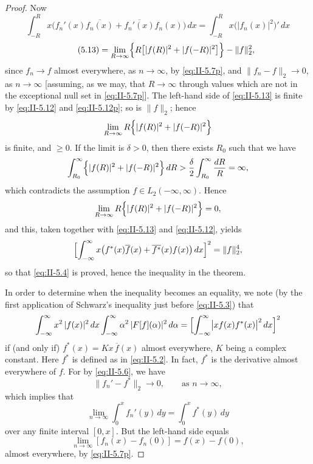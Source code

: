 \begin{proof}
Now
\[
\int_{-R}^{R}x\bigl(f_{n}'(x)\overline{f_{n}(x)}+\overline{f_{n}'(x)}f_{n}(x)\bigr)\,dx
=\int_{-R}^{R}x\bigl(|f_{n}(x)|^{2}\bigr)'\,dx
\]
\begin{equation}\tag{5.13}\label{eq:II-5.13}
=\lim_{R\to\infty}\Bigl\{R\bigl[|f(R)|^{2}+|f(-R)|^{2}\bigr]\Bigr\}-\|f\|_{2}^{2},
\end{equation}
since $f_{n}\to f$ almost everywhere, as $n\to\infty$, by \eqref{eq:II-5.7p}, and $\|f_{n}-f\|_{2}\to 0$, as $n\to\infty$ [assuming, as we may, that $R\to\infty$ through values which are not in the exceptional null set in \eqref{eq:II-5.7p}]. The left-hand side of \eqref{eq:II-5.13} is finite by \eqref{eq:II-5.12} and \eqref{eq:II-5.12p}; so is $\|f\|_{2}$; hence
\[
\lim_{R\to\infty}R\Bigl\{|f(R)|^{2}+|f(-R)|^{2}\Bigr\}
\]
is finite, and $\ge 0$. If the limit is $\delta>0$, then there exists $R_{0}$ such that we have
\[
\int_{R_{0}}^{\infty}\Bigl\{|f(R)|^{2}+|f(-R)|^{2}\Bigr\}\,dR
>\frac{\delta}{2}\int_{R_{0}}^{\infty}\frac{dR}{R}=\infty,
\]
which contradicts the assumption $f\in L_{2}(-\infty,\infty)$. Hence
\[
\lim_{R\to\infty}R\Bigl\{|f(R)|^{2}+|f(-R)|^{2}\Bigr\}=0,
\]
and this, taken together with \eqref{eq:II-5.13} and \eqref{eq:II-5.12}, yields
\[
\Bigl[\int_{-\infty}^{\infty}x\bigl(f^{*}(x)\overline{f}(x)+\overline{f^{*}}(x)f(x)\bigr)\,dx\Bigr]^{2}=\|f\|_{2}^{4},
\]
so that \eqref{eq:II-5.4} is proved, hence the inequality in the theorem.

In order to determine when the inequality becomes an equality, we note (by the first application of Schwarz's inequality just before \eqref{eq:II-5.3}) that
\[
\int_{-\infty}^{\infty}x^{2}\,|f(x)|^{2}\,dx
\int_{-\infty}^{\infty}\alpha^{2}\,|F[f](\alpha)|^{2}\,d\alpha
=\Bigl[\int_{-\infty}^{\infty}\bigl|x f(x)f^{*}(x)\bigr|^{2}\,dx\Bigr]^{2}
\]
if (and only if) $f^{*}(x)=K x\,\overline{f}(x)$ almost everywhere, $K$ being a complex constant. Here $f^{*}$ is defined as in \eqref{eq:II-5.2}. In fact, $f^{*}$ is the derivative almost everywhere of $f$. For by \eqref{eq:II-5.6}, we have
\[
\|f_{n}'-f^{*}\|_{2}\to 0,\qquad\text{as }n\to\infty,
\]
which implies that
\[
\lim_{n\to\infty}\int_{0}^{x}f_{n}'(y)\,dy=\int_{0}^{x}f^{*}(y)\,dy
\]
over any finite interval $[0,x]$. But the left-hand side equals
\[
\lim_{n\to\infty}[f_{n}(x)-f_{n}(0)]=f(x)-f(0),
\]
almost everywhere, by \eqref{eq:II-5.7p}.


\end{proof}
